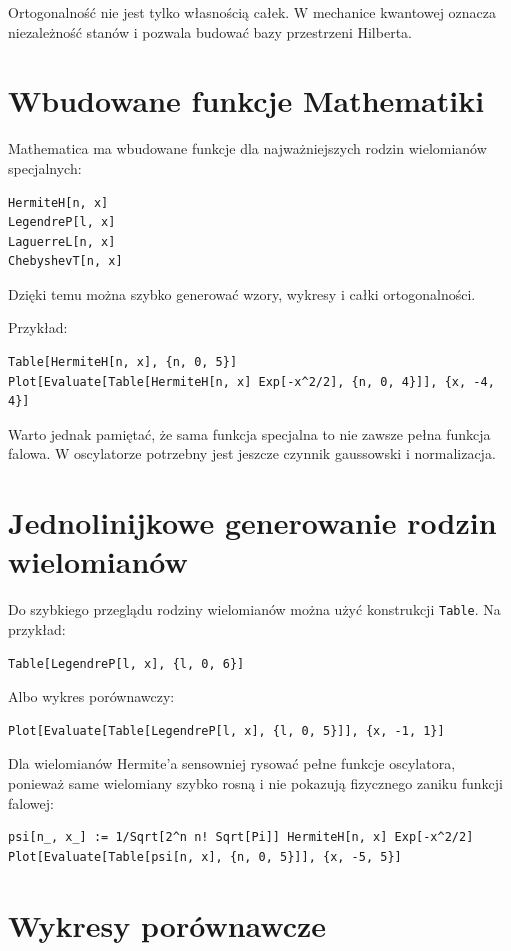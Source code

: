 \begin{summarybox}
Ortogonalność nie jest tylko własnością całek. W mechanice kwantowej oznacza niezależność stanów i pozwala budować bazy przestrzeni Hilberta.
\end{summarybox}

\section{Wbudowane funkcje Mathematiki}

Mathematica ma wbudowane funkcje dla najważniejszych rodzin wielomianów specjalnych:
\begin{verbatim}
HermiteH[n, x]
LegendreP[l, x]
LaguerreL[n, x]
ChebyshevT[n, x]
\end{verbatim}
Dzięki temu można szybko generować wzory, wykresy i całki ortogonalności.

Przykład:
\begin{verbatim}
Table[HermiteH[n, x], {n, 0, 5}]
Plot[Evaluate[Table[HermiteH[n, x] Exp[-x^2/2], {n, 0, 4}]], {x, -4, 4}]
\end{verbatim}
Warto jednak pamiętać, że sama funkcja specjalna to nie zawsze pełna funkcja falowa. W oscylatorze potrzebny jest jeszcze czynnik gaussowski i normalizacja.

\section{Jednolinijkowe generowanie rodzin wielomianów}

Do szybkiego przeglądu rodziny wielomianów można użyć konstrukcji \texttt{Table}. Na przykład:
\begin{verbatim}
Table[LegendreP[l, x], {l, 0, 6}]
\end{verbatim}
Albo wykres porównawczy:
\begin{verbatim}
Plot[Evaluate[Table[LegendreP[l, x], {l, 0, 5}]], {x, -1, 1}]
\end{verbatim}

Dla wielomianów Hermite'a sensowniej rysować pełne funkcje oscylatora, ponieważ same wielomiany szybko rosną i nie pokazują fizycznego zaniku funkcji falowej:
\begin{verbatim}
psi[n_, x_] := 1/Sqrt[2^n n! Sqrt[Pi]] HermiteH[n, x] Exp[-x^2/2]
Plot[Evaluate[Table[psi[n, x], {n, 0, 5}]], {x, -5, 5}]
\end{verbatim}

\section{Wykresy porównawcze}


